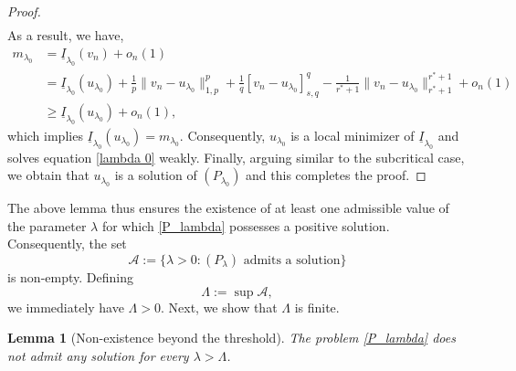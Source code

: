 \documentclass[reqno,oneside]{amsart}
\newtheorem{lemma}[theorem]{Lemma}
\theoremstyle{definition}
\theoremstyle{remark}
\numberwithin{equation}{section}
\newcommand{\il}{\underline{I}}
\newcommand{\la} {\lambda}
\begin{document}
\begin{proof}
\begin{multline}
    \end{multline}
    As a result, we have,
    \begin{equation*}
        \begin{aligned}
            m_{\la_0} &= \il_{\la_0} (v_n) + o_n(1)\\
            &= \il_{\la_0} (u_{\la_0}) + \frac{1}{p} \|v_n - u_{\la_0}\|^p_{1,p} + \frac{1}{q} [v_n - u_{\la_0}]^q_{s,q} - \frac{1}{r^* +1} \|v_n - u_{\la_0}\|^{r^* +1}_{r^* +1} + o_n(1)\\
            &\geq \il_{\la_0} (u_{\la_0}) + o_n(1),
        \end{aligned}
    \end{equation*}
    which implies $\il_{\la_0} (u_{\la_0}) = m_{\la_0}$. Consequently, $u_{\la_0}$ is a local minimizer of $\il_{\la_0}$ and solves equation \eqref{lambda 0} weakly. Finally, arguing similar to the subcritical case, we obtain that $u_{\la_0}$ is a solution of $(P_{\la_0})$ and this completes the proof.
\end{proof}

The above lemma thus ensures the existence of at least one admissible value of the parameter $\la$ for which \eqref{P_lambda} possesses a positive solution. Consequently, the set
\[\mathcal{A}:= \{\la>0 : (P_{\la}) \text{ admits a solution} \}\]
is non-empty. Defining
\begin{equation}\label{definition of threshold}
    \Lambda:= \sup \mathcal{A},
\end{equation}
we immediately have $\Lambda >0$. Next, we show that $\Lambda$ is finite.

\begin{lemma}[Non-existence beyond the threshold]\label{nonexistence}
    The problem \eqref{P_lambda} does not admit any solution for every $\la > \Lambda$.
\end{lemma}
\end{document}
